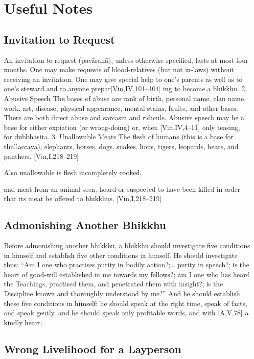 \chapter{Useful Notes}

\section{Invitation to Request}

An invitation to request (pavāraṇā), unless
otherwise specified, lasts at most four months.
One may make requests of blood-relatives (but
not in-laws) without receiving an invitation.
One may give special help to one’s parents as
well as to one’s steward and to anyone prepar[Vin,IV,101–104]
ing to become a bhikkhu.
2. Abusive Speech
The bases of abuse are rank of birth, personal
name, clan name, work, art, disease, physical
appearance, mental stains, faults, and other
bases. There are both direct abuse and sarcasm
and ridicule. Abusive speech may be a base for
either expiation (or wrong-doing) or, when
[Vin,IV,4–11]
only teasing, for dubbhāsita.
3. Unallowable Meats
The flesh of humans (this is a base for thullaccaya), elephants, horses, dogs, snakes, lions,
tigers, leopards, bears, and panthers.
[Vin,I,218–219]

Also unallowable is flesh incompletely cooked,

and meat from an animal seen, heard or suspected to have been killed in order that its meat
be offered to bhikkhus.
[Vin,I,218–219]

\section{Admonishing Another Bhikkhu}

Before admonishing another bhikkhu, a
bhikkhu should investigate five conditions in
himself and establish five other conditions in
himself.
He should investigate thus: “Am I one who
practises purity in bodily action?;… purity in
speech?; is the heart of good-will established
in me towards my fellows?; am I one who has
heard the Teachings, practised them, and penetrated them with insight?; is the Discipline
known and thoroughly understood by me?”
And he should establish these five conditions
in himself: he should speak at the right time,
speak of facts, and speak gently, and he
should speak only profitable words, and with
[A,V,78]
a kindly heart.

\section{Wrong Livelihood for a Layperson}


